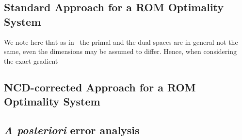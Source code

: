 \subsection{Standard Approach for a ROM Optimality System}

We note here that as in~\cite[Section 3.2]{Keil2021} the primal and the dual spaces are in general not the same, even the dimensions may be assumed to differ.
Hence, when considering the exact gradient


\subsection{NCD-corrected Approach for a ROM Optimality System}


\subsection{\textit{A posteriori} error analysis}

